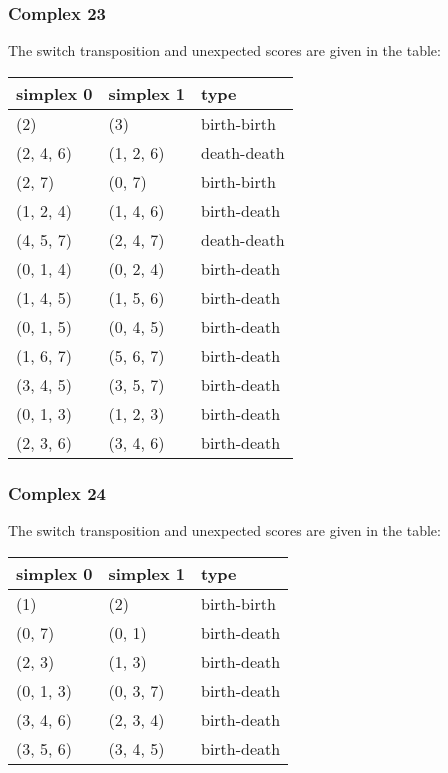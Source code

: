 \documentclass{article}
\begin{document}
\subsubsection{Complex 23}
\par The switch transposition and unexpected scores are given in the table:
\begin{center}
\begin{tabular}{lll}
\toprule
simplex 0 & simplex 1 & type \\
\midrule
(2) & (3) & birth-birth \\
(2, 4, 6) & (1, 2, 6) & death-death \\
(2, 7) & (0, 7) & birth-birth \\
(1, 2, 4) & (1, 4, 6) & birth-death \\
(4, 5, 7) & (2, 4, 7) & death-death \\
(0, 1, 4) & (0, 2, 4) & birth-death \\
(1, 4, 5) & (1, 5, 6) & birth-death \\
(0, 1, 5) & (0, 4, 5) & birth-death \\
(1, 6, 7) & (5, 6, 7) & birth-death \\
(3, 4, 5) & (3, 5, 7) & birth-death \\
(0, 1, 3) & (1, 2, 3) & birth-death \\
(2, 3, 6) & (3, 4, 6) & birth-death \\
\bottomrule
\end{tabular}
\end{center}


\subsubsection{Complex 24}
\par The switch transposition and unexpected scores are given in the table:
\begin{center}
\begin{tabular}{lll}
\toprule
simplex 0 & simplex 1 & type \\
\midrule
(1) & (2) & birth-birth \\
(0, 7) & (0, 1) & birth-death \\
(2, 3) & (1, 3) & birth-death \\
(0, 1, 3) & (0, 3, 7) & birth-death \\
(3, 4, 6) & (2, 3, 4) & birth-death \\
(3, 5, 6) & (3, 4, 5) & birth-death \\
\bottomrule
\end{tabular}
\end{center}
\end{document}

